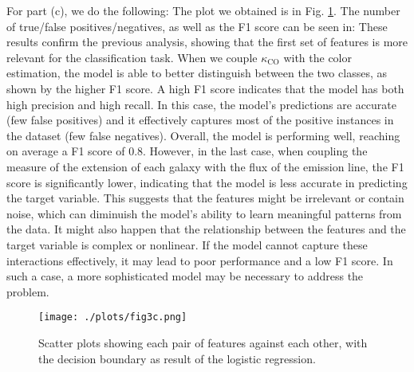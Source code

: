 For part (c), we do the following: 
The plot we obtained is in Fig. \ref{fig:fig3c}.
The number of true/false positives/negatives, as well as the F1 score can be seen in: 
These results confirm the previous analysis, showing that the first set of features is more relevant for the classification task. When we couple $\kappa_\text{CO}$  with the color estimation, the model is able to better distinguish between the two classes, as shown by the higher F1 score.
A high F1 score indicates that the model has both high precision and high recall. In this case, the model's predictions are accurate (few false positives) and it effectively captures most of the positive instances in the dataset (few false negatives). 
Overall, the model is performing well, reaching on average a F1 score of 0.8. However, in the last case, when coupling the measure of the extension of each galaxy with the flux of the emission line, 
the F1 score is significantly lower, indicating that the model is less accurate in predicting the target variable. This suggests that the features might be irrelevant or contain noise, which can diminuish the model's ability to learn meaningful patterns from the data.
It might also happen that the relationship between the features and the target variable is complex or nonlinear. If the model cannot capture these interactions effectively, it may lead to poor performance and a low F1 score. 
In such a case, a more sophisticated model may be necessary to address the problem.

\begin{figure}[h!]
  \centering
  \texttt{[image: ./plots/fig3c.png]}
  \caption{Scatter plots showing each pair of features against each other, with the decision boundary as result of the logistic regression.} 
  \label{fig:fig3c}
\end{figure}


